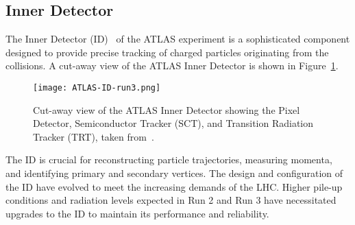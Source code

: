     \subsection{Inner Detector}
        The Inner Detector (ID)~\cite{IDET-2010-01,IDET-2013-01,IDET-2015-01} of the ATLAS experiment 
        is a sophisticated component designed to provide 
        precise tracking of charged particles originating from the collisions. A cut-away view of the
        ATLAS Inner Detector is shown in Figure~\ref{fig:ID_cutaway}.
        \begin{figure}[htbp]
            \centering
            \texttt{[image: ATLAS-ID-run3.png]}
            \caption{Cut-away view of the ATLAS Inner Detector showing the Pixel Detector, 
                Semiconductor Tracker (SCT), and Transition Radiation Tracker (TRT), taken from~\cite{GENR-2019-02}.}
            \label{fig:ID_cutaway}
        \end{figure}
        The ID is crucial for reconstructing particle trajectories, measuring momenta, and identifying primary and 
        secondary vertices. The design and configuration of the ID have evolved to meet the increasing 
        demands of the LHC. Higher pile-up conditions and radiation levels expected in Run 2 and Run 3
        have necessitated upgrades to the ID to maintain its performance and reliability.
    
